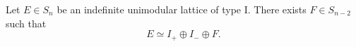 Let $E \in S_n$ be an indefinite unimodular lattice of type I. There exists $F \in S_{n-2}$ such that
$$
E \simeq I_+ \oplus I_- \oplus F.
$$

